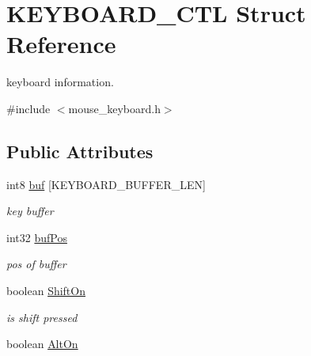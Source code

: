 \hypertarget{struct_k_e_y_b_o_a_r_d___c_t_l}{}\section{K\+E\+Y\+B\+O\+A\+R\+D\+\_\+\+C\+T\+L Struct Reference}
\label{struct_k_e_y_b_o_a_r_d___c_t_l}


keyboard information.  




{\ttfamily \#include $<$mouse\+\_\+keyboard.\+h$>$}

\subsection*{Public Attributes}
\begin{DoxyCompactItemize}
\item 
\hypertarget{struct_k_e_y_b_o_a_r_d___c_t_l_a4e1320a93bba0a0656e755a9761200ae}{}int8 \hyperlink{struct_k_e_y_b_o_a_r_d___c_t_l_a4e1320a93bba0a0656e755a9761200ae}{buf} \mbox{[}K\+E\+Y\+B\+O\+A\+R\+D\+\_\+\+B\+U\+F\+F\+E\+R\+\_\+\+L\+E\+N\mbox{]}\label{struct_k_e_y_b_o_a_r_d___c_t_l_a4e1320a93bba0a0656e755a9761200ae}

\begin{DoxyCompactList}\small\item\em key buffer \end{DoxyCompactList}\item 
\hypertarget{struct_k_e_y_b_o_a_r_d___c_t_l_af438e4cb4f4eee033dd51b9df6479653}{}int32 \hyperlink{struct_k_e_y_b_o_a_r_d___c_t_l_af438e4cb4f4eee033dd51b9df6479653}{buf\+Pos}\label{struct_k_e_y_b_o_a_r_d___c_t_l_af438e4cb4f4eee033dd51b9df6479653}

\begin{DoxyCompactList}\small\item\em pos of buffer \end{DoxyCompactList}\item 
\hypertarget{struct_k_e_y_b_o_a_r_d___c_t_l_a3ca16b144b2afb90964c554fce2f254f}{}boolean \hyperlink{struct_k_e_y_b_o_a_r_d___c_t_l_a3ca16b144b2afb90964c554fce2f254f}{Shift\+On}\label{struct_k_e_y_b_o_a_r_d___c_t_l_a3ca16b144b2afb90964c554fce2f254f}

\begin{DoxyCompactList}\small\item\em is shift pressed \end{DoxyCompactList}\item 
\hypertarget{struct_k_e_y_b_o_a_r_d___c_t_l_adcfb4addd2b640db47965de0a4dc3b88}{}boolean \hyperlink{struct_k_e_y_b_o_a_r_d___c_t_l_adcfb4addd2b640db47965de0a4dc3b88}{Alt\+On}\label{struct_k_e_y_b_o_a_r_d___c_t_l_adcfb4addd2b640db47965de0a4dc3b88}


\end{DoxyCompactItemize}
